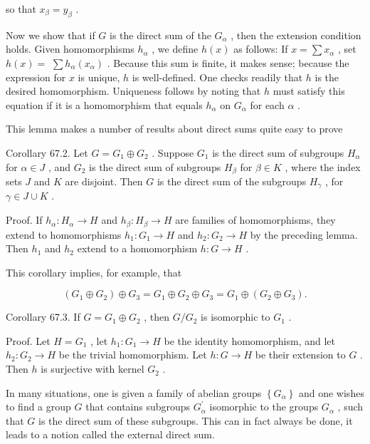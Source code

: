 so that \({x}_{\beta } = {y}_{\beta }\) .

Now we show that if \(G\) is the direct sum of the \({G}_{\alpha }\) , then the extension condition holds. Given homomorphisms \({h}_{\alpha }\) , we define \(h\left( x\right)\) as follows: If \(x = \sum {x}_{\alpha }\) , set \(h\left( x\right)  =\)  \(\sum {h}_{\alpha }\left( {x}_{\alpha }\right)\) . Because this sum is finite, it makes sense; because the expression for \(x\) is unique, \(h\) is well-defined. One checks readily that \(h\) is the desired homomorphism. Uniqueness follows by noting that \(h\) must satisfy this equation if it is a homomorphism that equals \({h}_{\alpha }\) on \({G}_{\alpha }\) for each \(\alpha\) .

This lemma makes a number of results about direct sums quite easy to prove

Corollary 67.2. Let \(G = {G}_{1} \oplus  {G}_{2}\) . Suppose \({G}_{1}\) is the direct sum of subgroups \({H}_{\alpha }\) for \(\alpha  \in  J\) , and \({G}_{2}\) is the direct sum of subgroups \({H}_{\beta }\) for \(\beta  \in  K\) , where the index sets \(J\) and \(K\) are disjoint. Then \(G\) is the direct sum of the subgroups \({H}_{\gamma }\) , for \(\gamma  \in  J \cup  K\) .

Proof. If \({h}_{\alpha } : {H}_{\alpha } \rightarrow  H\) and \({h}_{\beta } : {H}_{\beta } \rightarrow  H\) are families of homomorphisms, they extend to homomorphisms \({h}_{1} : {G}_{1} \rightarrow  H\) and \({h}_{2} : {G}_{2} \rightarrow  H\) by the preceding lemma. Then \({h}_{1}\) and \({h}_{2}\) extend to a homomorphism \(h : G \rightarrow  H\) .

This corollary implies, for example, that

\[
\left( {{G}_{1} \oplus  {G}_{2}}\right)  \oplus  {G}_{3} = {G}_{1} \oplus  {G}_{2} \oplus  {G}_{3} = {G}_{1} \oplus  \left( {{G}_{2} \oplus  {G}_{3}}\right) .
\]

Corollary 67.3. If \(G = {G}_{1} \oplus  {G}_{2}\) , then \(G/{G}_{2}\) is isomorphic to \({G}_{1}\) .

Proof. Let \(H = {G}_{1}\) , let \({h}_{1} : {G}_{1} \rightarrow  H\) be the identity homomorphism, and let \({h}_{2} : {G}_{2} \rightarrow  H\) be the trivial homomorphism. Let \(h : G \rightarrow  H\) be their extension to \(G\) . Then \(h\) is surjective with kernel \({G}_{2}\) .

In many situations, one is given a family of abelian groups \(\left\{  {G}_{\alpha }\right\}\) and one wishes to find a group \(G\) that contains subgroups \({G}_{\alpha }^{\prime }\) isomorphic to the groups \({G}_{\alpha }\) , such that \(G\) is the direct sum of these subgroups. This can in fact always be done, it leads to a notion called the external direct sum.


